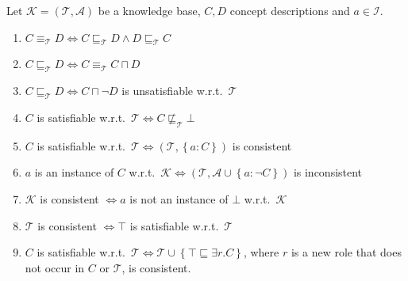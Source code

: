 \begin{theorem}
	Let $\mathcal{K} = \left( \mathcal{T}, \mathcal{A} \right)$ be a knowledge base, 
	$C, D$ concept descriptions and $a \in \mathscr{I}$.
	\begin{enumerate}
		\item $C \equiv_{\mathcal{T}} D \iff C \sqsubseteq_{\mathcal{T}} D \land D \sqsubseteq_{\mathcal{T}} C$ 
		\item $C \sqsubseteq_{\mathcal{T}} D \iff C \equiv_{\mathcal{T}} C \sqcap D$
		\item $C \sqsubseteq_{\mathcal{T}} D \iff C \sqcap \neg D$ is unsatisfiable w.r.t.\ $\mathcal{T}$
		\item $C$ is satisfiable w.r.t.\ $\mathcal{T} \iff C \not\sqsubseteq_{\mathcal{T}} \bot$
		\item $C$ is satisfiable w.r.t.\ $\mathcal{T} \iff \left( \mathcal{T}, \left\{ a:C \right\} \right)$ is consistent
		\item $a$ is an instance of $C$ w.r.t.\ $\mathcal{K} \iff \left( \mathcal{T}, \mathcal{A} \cup \left\{ a: \neg C \right\} \right)$ is inconsistent
		\item $\mathcal{K}$ is consistent $\iff a$ is not an instance of $\bot$ w.r.t.\ $\mathcal{K}$
		\item $\mathcal{T}$ is consistent $\iff \top$ is satisfiable w.r.t.\ $\mathcal{T}$
		\item $C$ is satisfiable w.r.t.\ $\mathcal{T} \iff \mathcal{T} \cup \left\{ \top \sqsubseteq \exists r.C \right\}$,
			where $r$ is a new role that does not occur in $C$ or $\mathcal{T}$,
			is consistent.
	\end{enumerate}
\end{theorem}
